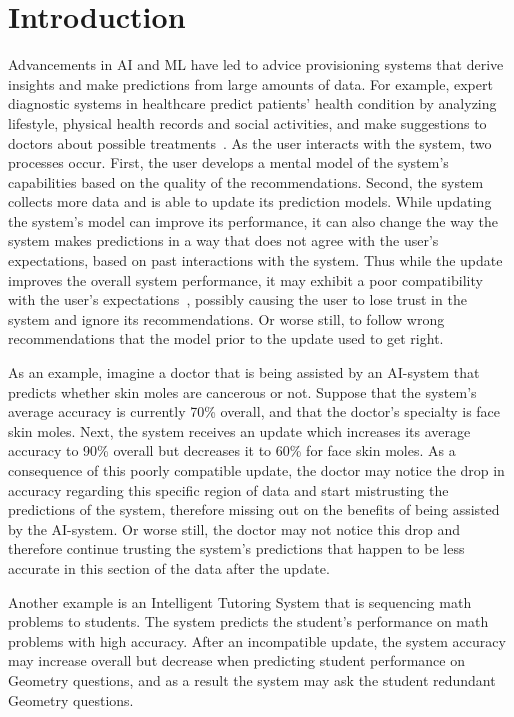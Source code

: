 \documentclass[letterpaper]{article}
\theoremstyle{definition}
\begin{document}
\section{Introduction}
\label{sec:intro}
Advancements in AI and ML have led to advice provisioning systems that derive insights and make predictions from large amounts of data. For example, expert diagnostic systems in healthcare predict patients' health condition by analyzing lifestyle, physical health records and social activities, and make suggestions to doctors about possible treatments~\cite{sahoo2019deepreco}.
As the user interacts with the system, two processes occur. First, the user develops a mental model of the system's capabilities based on the quality of the recommendations. Second, the system collects more data and is able to update its prediction models. While updating the system's model can improve its performance, it can also change the way the system makes predictions in a way that does not agree with the user's expectations, based on past interactions with the system. Thus while the update improves the overall system performance, it may exhibit a poor compatibility with the user's expectations~\cite{bansal2019updates}, possibly causing the user to lose trust in the system and ignore its recommendations. Or worse still, to follow wrong recommendations that the model prior to the update used to get right.

As an example, imagine a doctor that is being assisted by an AI-system that predicts whether skin moles are cancerous or not. Suppose that the system's average accuracy is currently 70\% overall, and that the doctor's specialty is face skin moles.
Next, the system  receives an update which increases its average accuracy to 90\% overall but decreases it to 60\% for face skin moles. As a consequence of this poorly compatible update, the doctor may notice the drop in accuracy regarding this specific region of data and start mistrusting the predictions of the system, therefore missing out on the benefits of being assisted by the AI-system.
Or worse still, the doctor may not notice this drop and therefore continue trusting the system's predictions that happen to be less accurate in this section of the data after the update.

Another example is an Intelligent Tutoring System that is sequencing math problems to students. The system predicts the student's performance on math problems with high accuracy. After an incompatible update, the system accuracy may increase overall but decrease when predicting student performance on Geometry questions, and as a result the system may ask the student redundant Geometry questions.
\end{document}
